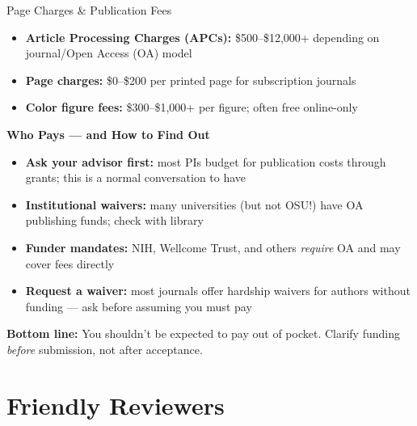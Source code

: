 \documentclass{beamer}
\begin{document}
\begin{frame}{Page Charges \& Publication Fees}

  \footnotesize
  \begin{itemize}
    \item \textbf{Article Processing Charges (APCs):} \$500--\$12,000+
      depending on journal/Open Access (OA) model
    \item \textbf{Page charges:}  \$0--\$200 per printed page for
      subscription journals
    \item \textbf{Color figure fees:} \$300--\$1,000+ per figure;
      often free online-only
  \end{itemize}

  \medskip
  \textbf{Who Pays --- and How to Find Out}
  \begin{itemize}
    \item \textbf{Ask your advisor first:} most PIs budget for publication
      costs through grants; this is a normal conversation to have
    \item \textbf{Institutional waivers:} many universities (but not OSU!) have
      OA publishing funds; check with library
    \item \textbf{Funder mandates:} NIH, Wellcome Trust, and others
      \emph{require} OA and may cover fees directly
    \item \textbf{Request a waiver:} most journals offer hardship waivers
      for authors without funding --- ask before assuming you must pay
  \end{itemize}

  \medskip
  \alert{\textbf{Bottom line:}} You shouldn't be expected to pay out of pocket.
  Clarify funding \emph{before} submission, not after acceptance.

\end{frame}




\section{Friendly Reviewers}
\end{document}
